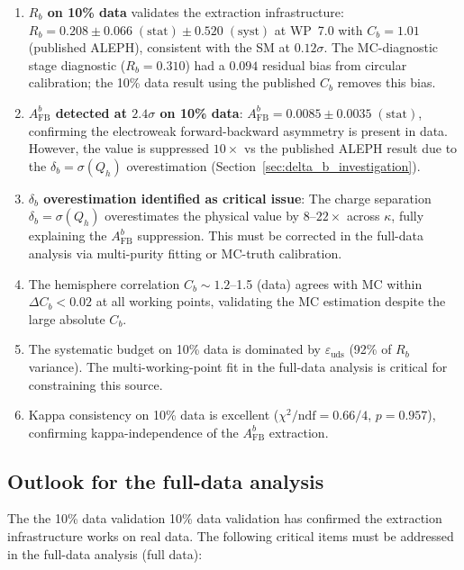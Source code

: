 \documentclass[11pt,a4paper]{article}
\begin{document}
\begin{enumerate}
\item \textbf{$R_b$ on 10\% data} validates the extraction infrastructure:
$R_b = 0.208 \pm 0.066\;\mathrm{(stat)} \pm 0.520\;\mathrm{(syst)}$ at WP~7.0
with $C_b = 1.01$ (published ALEPH), consistent with the SM at $0.12\sigma$.
The MC-diagnostic stage diagnostic ($R_b = 0.310$) had a $0.094$ residual bias from
circular calibration; the 10\% data result using the published $C_b$ removes
this bias.

\item \textbf{$A_\mathrm{FB}^b$ detected at $2.4\sigma$ on 10\% data}:
$A_\mathrm{FB}^b = 0.0085 \pm 0.0035\;\mathrm{(stat)}$, confirming the
electroweak forward-backward asymmetry is present in data. However, the
value is suppressed $10\times$ vs the published ALEPH result due to the
$\delta_b = \sigma(Q_h)$ overestimation (Section~\ref{sec:delta_b_investigation}).

\item \textbf{$\delta_b$ overestimation identified as critical issue}:
The charge separation $\delta_b = \sigma(Q_h)$ overestimates the physical value
by $8$--$22\times$ across $\kappa$, fully explaining the $A_\mathrm{FB}^b$ suppression.
This must be corrected in the full-data analysis via multi-purity fitting or MC-truth calibration.

\item The hemisphere correlation $C_b \sim 1.2$--1.5 (data) agrees with MC within
$\Delta C_b < 0.02$ at all working points, validating the MC estimation despite
the large absolute $C_b$.

\item The systematic budget on 10\% data is dominated by $\varepsilon_\mathrm{uds}$
(92\% of $R_b$ variance). The multi-working-point fit in the full-data analysis is critical for
constraining this source.

\item Kappa consistency on 10\% data is excellent ($\chi^2/\mathrm{ndf} = 0.66/4$,
$p = 0.957$), confirming kappa-independence of the $A_\mathrm{FB}^b$ extraction.
\end{enumerate}

\subsection{Outlook for the full-data analysis}
\label{sec:outlook}

The the 10\% data validation 10\% data validation has confirmed the extraction infrastructure works
on real data. The following critical items must be addressed in the full-data analysis (full data):
\end{document}
